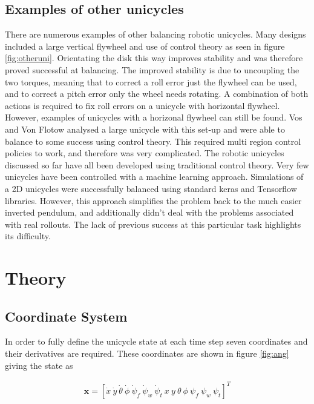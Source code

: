 \documentclass[twoside,twocolumn,12pt]{article}
\begin{document}
\subsection{Examples of other unicycles}
There are numerous examples of other balancing robotic unicycles. Many designs included a large vertical flywheel and use of control theory as seen in figure \ref{fig:otheruni}. Orientating the disk this way improves stability and was therefore proved successful at balancing. The improved stability is due to uncoupling the two torques, meaning that to correct a roll error just the flywheel can be used, and to correct a pitch error only the wheel needs rotating. A combination of both actions is required to fix roll errors on a unicycle with horizontal flywheel.
\newline
However, examples of unicycles with a horizonal flywheel can still be found. \cite{other3}  Vos and Von Flotow analysed a large unicycle with this set-up and were able to balance to some success using control theory. This required multi region control policies to work, and therefore was very complicated.
\newline
The robotic unicycles discussed so far have all been developed using traditional control theory. Very few unicycles have been controlled with a machine learning approach. Simulations of a 2D unicycles were successfully balanced \cite{other4} using standard keras and Tensorflow libraries. However, this approach simplifies the problem back to the much easier inverted pendulum, and additionally didn't deal with the problems associated with real rollouts. The lack of previous success at this particular task highlights its difficulty.

\clearpage
\section{Theory}
\subsection{Coordinate System}
In order to fully define the unicycle state at each time step seven coordinates and their derivatives are required. These coordinates are shown in figure \ref{fig:ang} giving the state as

\begin{align*}
\textbf{x} = [\dot{x} \: \dot{y}\: \dot{\theta}\: \dot{\phi}\: \dot{\psi}_f\: \dot{\psi}_w \:\dot{\psi}_t \: x \: y \: \theta \: \phi \: \psi_f \: \psi_w \: \psi_t]^T
\end{align*}
\end{document}
